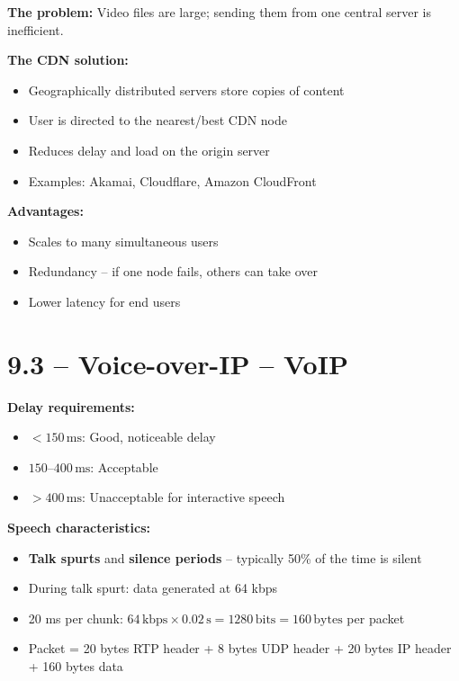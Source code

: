 \begin{tcolorbox}[keybox, title=CDN -- Content Distribution Networks]
\textbf{The problem:} Video files are large; sending them from one central server is inefficient.

\medskip
\textbf{The CDN solution:}
\begin{itemize}[nosep]
  \item Geographically distributed servers store copies of content
  \item User is directed to the nearest/best CDN node
  \item Reduces delay and load on the origin server
  \item Examples: Akamai, Cloudflare, Amazon CloudFront
\end{itemize}

\medskip
\textbf{Advantages:}
\begin{itemize}[nosep]
  \item Scales to many simultaneous users
  \item Redundancy -- if one node fails, others can take over
  \item Lower latency for end users
\end{itemize}
\end{tcolorbox}

\section{9.3 -- Voice-over-IP -- VoIP}

\begin{tcolorbox}[keybox, title=VoIP -- Characteristics and requirements]
\textbf{Delay requirements:}
\begin{itemize}[nosep]
  \item $< 150\,\text{ms}$: Good, noticeable delay
  \item $150$--$400\,\text{ms}$: Acceptable
  \item $> 400\,\text{ms}$: Unacceptable for interactive speech
\end{itemize}

\medskip
\textbf{Speech characteristics:}
\begin{itemize}[nosep]
  \item \textbf{Talk spurts} and \textbf{silence periods} -- typically 50\% of the time is silent
  \item During talk spurt: data generated at 64 kbps
  \item 20 ms per chunk: $64\,\text{kbps} \times 0.02\,\text{s} = 1280\,\text{bits} = 160\,\text{bytes}$ per packet
  \item Packet = 20 bytes RTP header + 8 bytes UDP header + 20 bytes IP header + 160 bytes data
\end{itemize}
\end{tcolorbox}

